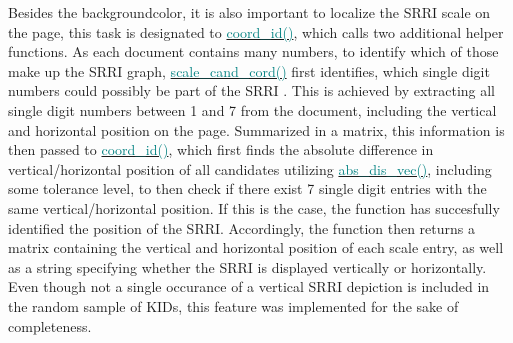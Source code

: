 \documentclass[aodsor,preprint]{imsart}
\numberwithin{equation}{section}
\theoremstyle{plain}
\begin{document}
Besides the backgroundcolor, it is also important to localize the SRRI scale on the page, this task is designated to \href{https://github.com/Base-R-Best-R/KID/blob/main/Code/Package/KIDs/R/coord_id.R}{\textcolor{teal}{coord\_id()}}, which calls two additional helper functions. As each document contains many numbers, to identify which of those make up the SRRI graph, \href{https://github.com/Base-R-Best-R/KID/blob/main/Code/Package/KIDs/R/scale_cand_coord.R}{\textcolor{teal}{scale\_cand\_cord()}} first identifies, which single digit numbers could possibly be part of the SRRI \citep{pdftools}. This is achieved by extracting all single digit numbers between 1 and 7 from the document, including the vertical and horizontal position on the page. Summarized in a matrix, this information is then passed to \href{https://github.com/Base-R-Best-R/KID/blob/main/Code/Package/KIDs/R/coord_id.R}{\textcolor{teal}{coord\_id()}}, which first finds the absolute difference in vertical/horizontal position of all candidates utilizing \href{https://github.com/Base-R-Best-R/KID/blob/main/Code/Package/KIDs/R/abs_dis_vec.R}{\textcolor{teal}{abs\_dis\_vec()}}, including some tolerance level, to then check if there exist 7 single digit entries with the same vertical/horizontal position. If this is the case, the function has succesfully identified the position of the SRRI. Accordingly, the function then returns a matrix containing the vertical and horizontal position of each scale entry, as well as a string specifying whether the SRRI is displayed vertically or horizontally. Even though not a single occurance of a vertical SRRI depiction is included in the random sample of KIDs, this feature was implemented for the sake of completeness.

\newpage
\end{document}
